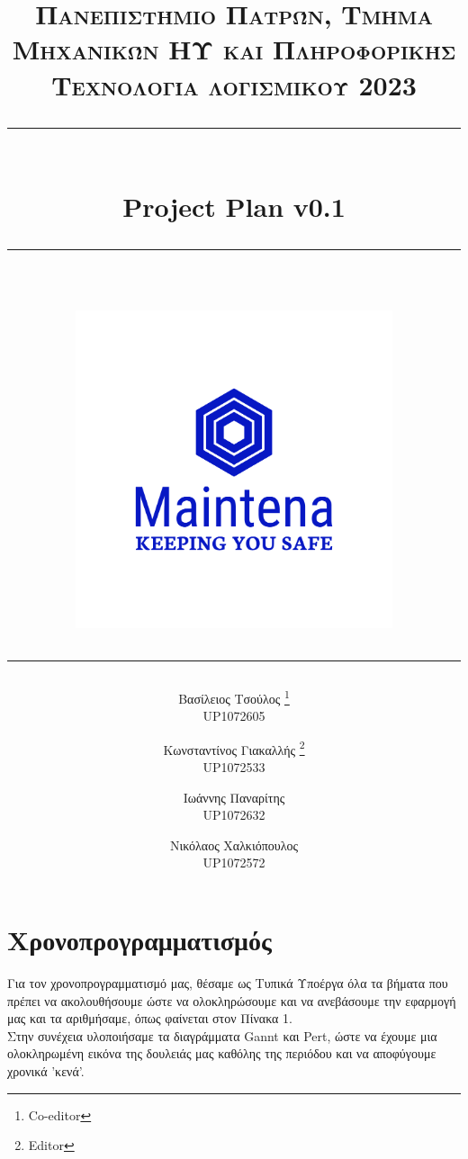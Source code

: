 \documentclass[11pt]{scrartcl} %
\title{	
	\normalfont\normalsize
	\textsc{Πανεπιστήμιο Πατρών, Τμήμα Μηχανικών ΗΥ και Πληροφορικής \\Τεχνολογία λογισμικού 2023}\\ %
	\vspace{25pt} %
	\rule{\linewidth}{0.5pt}\\ %
	\vspace{20pt} %
    {\Large Project Plan v0.1}\\ %
	\vspace{12pt} %
	\rule{\linewidth}{0.5pt}\\ %
	\vspace{12pt} %
    \includegraphics[width=0.7\textwidth]{../../brand/png/logo-transparent.png}
        \rule{\linewidth}{2pt}
}
\author{
Βασίλειος Τσούλος \thanks{Co-editor} \\UP1072605 \and Κωνσταντίνος Γιακαλλής \thanks{Editor} \\UP1072533
\and \hspace{-1ex} Ιωάννης Παναρίτης \\ \hspace{-1ex} UP1072632  \and Νικόλαος Χαλκιόπουλος \\UP1072572
}
\date{} %
\begin{document}
\maketitle
\pagebreak
\Large

\tableofcontents
\pagebreak

\section{Χρονοπρογραμματισμός}

Για τον χρονοπρογραμματισμό μας, θέσαμε ως Τυπικά Υποέργα όλα τα βήματα που πρέπει να
ακολουθήσουμε ώστε να ολοκληρώσουμε και να ανεβάσουμε την εφαρμογή μας και τα αριθμήσαμε, όπως φαίνεται στον Πίνακα 1. \\
Στην συνέχεια υλοποιήσαμε τα διαγράμματα Gannt και Pert, ώστε να έχουμε μια ολοκληρωμένη εικόνα της δουλειάς μας καθόλης της περιόδου και να αποφύγουμε χρονικά 'κενά'.

\end{document}
